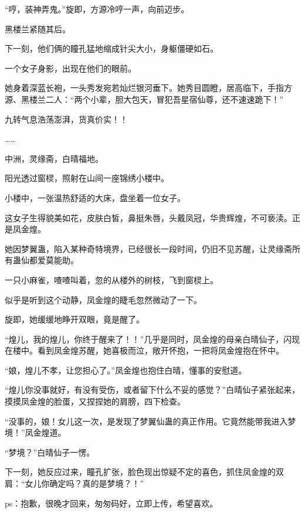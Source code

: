 \begin{this_body}
“哼，装神弄鬼。”旋即，方源冷哼一声，向前迈步。

黑楼兰紧随其后。

下一刻，他们俩的瞳孔猛地缩成针尖大小，身躯僵硬如石。

一个女子身影，出现在他们的眼前。

她身着深蓝长袍，一头秀发宛若灿烂银河垂下。她秀目圆瞪，居高临下，手指方源、黑楼兰二人：“两个小辈，胆大包天，冒犯吾星宿仙尊，还不速速跪下！”

九转气息浩荡澎湃，货真价实！！

……

中洲，灵缘斋，白晴福地。

阳光透过窗棂，照射在山间一座锦绣小楼中。

小楼中，一张温热舒适的大床，盘坐着一位女子。

这女子生得貌美如花，皮肤白皙，鼻挺朱唇，头戴凤冠，华贵辉煌，不可亵渎。正是凤金煌。

她因梦翼蛊，陷入某种奇特境界，已经很长一段时间，仍旧不见苏醒，让灵缘斋所有蛊仙都爱莫能助。

一只小麻雀，喳喳叫着，忽的从楼外的树枝，飞到窗棂上。

似乎是听到这个动静，凤金煌的睫毛忽然微动了一下。

旋即，她缓缓地睁开双眼，竟是醒了。

“煌儿，我的煌儿，你终于醒来了！！”几乎是同时，凤金煌的母亲白晴仙子，闪现在楼中。看到凤金煌苏醒，她喜极而泣，敞开怀抱，一把将凤金煌抱在怀中。

“娘，煌儿不孝，让您担心了。”凤金煌也抱住白晴，懂事的安慰道。

“煌儿你没事就好，有没有受伤，或者留下什么不妥的感觉？”白晴仙子紧张起来，摸摸凤金煌的脸蛋，又捏捏她的肩膀，四下检查。

“没事的，娘！女儿这一次，是发现了梦翼仙蛊的真正作用。它竟然能带我进入梦境！”凤金煌道。

“梦境？”白晴仙子一愣。

下一刻，她反应过来，瞳孔扩张，脸色现出惊疑不定的喜色，抓住凤金煌的双肩：“女儿你确定吗？真的是梦境？！”

ps：抱歉，很晚才回来，匆匆码好，立即上传，希望喜欢。

\end{this_body}

